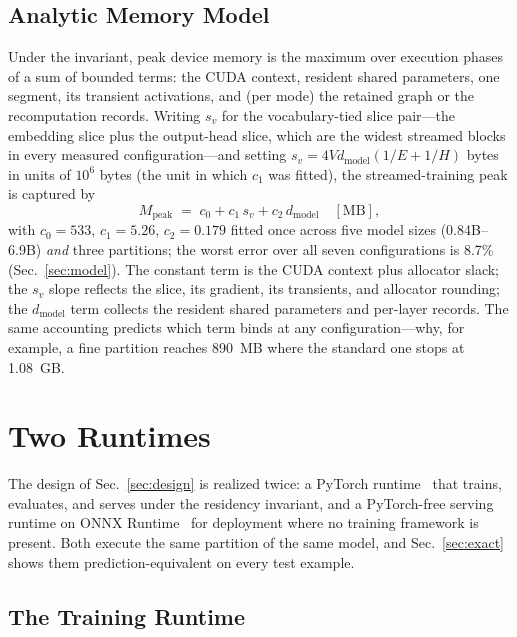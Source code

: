 \documentclass[journal]{IEEEtran}
\begin{document}
\subsection{Analytic Memory Model}\label{sec:memlaw}
Under the invariant, peak device memory is the maximum over execution phases
of a sum of bounded terms: the CUDA context, resident shared parameters, one
segment, its transient activations, and (per mode) the retained graph or the
recomputation records. Writing $s_{v}$ for the vocabulary-tied slice
pair---the embedding slice plus the output-head slice, which are the widest
streamed blocks in every measured configuration---and setting
$s_v = 4V d_\text{model}(1/E + 1/H)$ bytes in units of $10^6$ bytes (the unit
in which $c_1$ was fitted), the streamed-training peak is captured by
\begin{equation}\label{eq:memlaw}
M_\text{peak} \;=\; c_0 + c_1\, s_{v} + c_2\, d_\text{model}\quad[\text{MB}],
\end{equation}
with $c_0{=}533$, $c_1{=}5.26$, $c_2{=}0.179$ fitted once across five model
sizes (0.84B--6.9B) \emph{and} three partitions; the worst error over all
seven configurations is 8.7\% (Sec.~\ref{sec:model}). The constant term is the
CUDA context plus allocator slack; the $s_{v}$ slope reflects the slice, its
gradient, its transients, and allocator rounding; the $d_\text{model}$
term collects the resident shared parameters and per-layer records. The same
accounting predicts which term binds at any configuration---why, for
example, a fine partition reaches 890~MB where the standard one stops at
1.08~GB.

\section{Two Runtimes}\label{sec:impl}
The design of Sec.~\ref{sec:design} is realized twice: a PyTorch
runtime~\cite{paszke2019pytorch,ansel2024pytorch2} that trains, evaluates, and serves under the
residency invariant, and a PyTorch-free serving runtime on ONNX
Runtime~\cite{onnxruntime} for deployment where no training framework is
present. Both execute the same partition of the same model, and
Sec.~\ref{sec:exact} shows them prediction-equivalent on every test example.

\subsection{The Training Runtime}\label{sec:torchrt}
\end{document}
